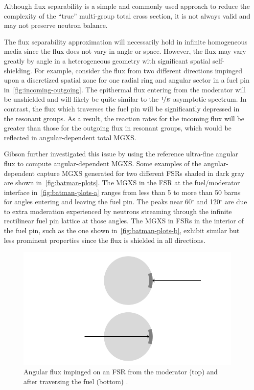 Although flux separability is a simple and commonly used approach to reduce the complexity of the ``true'' multi-group total cross section, it is not always valid and may not preserve neutron balance.

The flux separability approximation will necessarily hold in infinite homogeneous media since the flux does not vary in angle or space. However, the flux may vary greatly by angle in a heterogeneous geometry with significant spatial self-shielding. For example, consider the flux from two different directions impinged upon a discretized spatial zone for one radial ring and angular sector in a fuel pin in~\autoref{fig:incoming-outgoing}. The epithermal flux entering from the moderator will be unshielded and will likely be quite similar to the $\nicefrac{1}{E}$ asymptotic spectrum. In contrast, the flux which traverses the fuel pin will be significantly depressed in the resonant groups. As a result, the reaction rates for the incoming flux will be greater than those for the outgoing flux in resonant groups, which would be reflected in angular-dependent total MGXS.

Gibson further investigated this issue by using the reference ultra-fine angular flux to compute angular-dependent MGXS. Some examples of the angular-dependent capture MGXS generated for two different FSRs shaded in dark gray are shown in~\autoref{fig:batman-plots}. The MGXS in the FSR at the fuel/moderator interface in~\autoref{fig:batman-plots-a} ranges from less than 5 to more than 50 barns for angles entering and leaving the fuel pin. The peaks near 60$^{\circ}$ and 120$^{\circ}$ are due to extra moderation experienced by neutrons streaming through the infinite rectilinear fuel pin lattice at those angles. The MGXS in FSRs in the interior of the fuel pin, such as the one shown in~\autoref{fig:batman-plots-b}, exhibit similar but less prominent properties since the flux is shielded in all directions.

\begin{figure}[h!]
  \centering
  \includegraphics[width=\linewidth]{figures/incoming-outgoing}
  \caption{Angular flux impinged on an FSR from the moderator (top) and after traversing the fuel (bottom) \citep{gibson2016thesis}.}
\label{fig:incoming-outgoing}
\end{figure}

